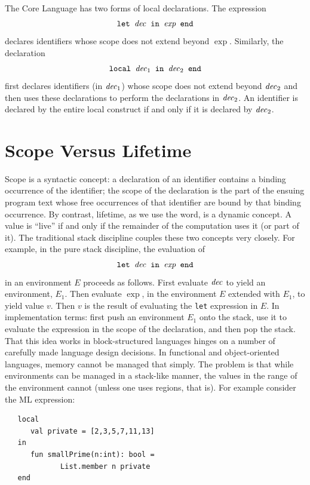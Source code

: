 \documentclass[12pt]{book}
\begin{document}
The Core Language has two forms of 
%
%
local declarations. The expression
$$\hbox{\tt let ${\it dec}$ in $\hbox{\it exp}$ end}$$
declares identifiers whose scope
does not extend beyond $\exp$. Similarly, the declaration
%
$$\hbox{\tt local ${\it dec}_1$ in ${\it dec}_2$ end}$$
first declares identifiers
(in ${\it dec}_1$) whose scope does not extend beyond ${\it dec}_2$ and then
uses these declarations to perform the declarations in ${\it dec}_2$. An
identifier is declared by the entire local construct if and only if it
is declared by ${\it dec}_2$.

\section{Scope Versus Lifetime}
\label{scope.sec}
Scope  
%
is a syntactic concept: a declaration of an identifier contains a
binding occurrence of the identifier; the scope of the declaration is
the part of the ensuing program text whose free occurrences of that
identifier are bound by that binding occurrence. By contrast,
lifetime, as we use the word, is a dynamic concept. A value is
``live'' if and only if the remainder of the computation uses it (or
part of it). The traditional 
%
stack discipline couples these two concepts very closely. For example,
in the pure stack discipline, the evaluation of
$$\hbox{\tt let ${\it dec}$ in $\hbox{\it exp}$ end}$$
in an environment $E$ proceeds as
follows. First evaluate ${\it dec}$ to yield an environment, $E_1$. Then
evaluate $\exp$, in the environment $E$ extended with $E_1$, to yield
value $v$. Then $v$ is the result of evaluating the {\tt let}
expression in $E$. In implementation terms: first push an environment
$E_1$ onto the stack, use it to evaluate the expression in the scope
of the declaration, and then pop the stack. That this idea works in
%
block-structured languages hinges on a number of carefully made
language design decisions. In functional and object-oriented
languages, memory cannot be managed that simply. The problem is that
while environments can be managed in a stack-like manner, the values
in the range of the environment cannot (unless one uses regions, that
is). For example consider the ML expression:
\begin{verbatim}
   local
      val private = [2,3,5,7,11,13]
   in
      fun smallPrime(n:int): bool = 
             List.member n private
   end
\end{verbatim}
\end{document}
